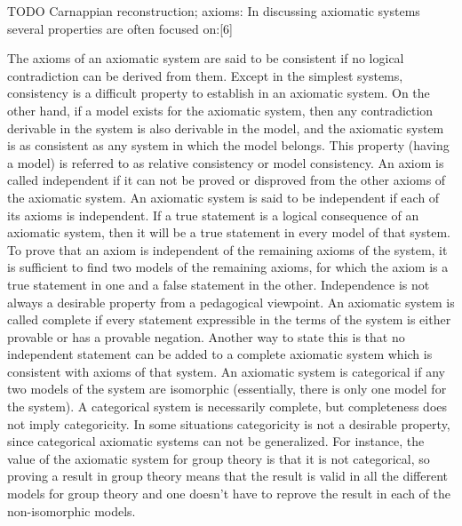 \documentclass{report}
\begin{document}
\begin{comment}
Finally two general points about why we do what we do in this text. Firstly it is a general goal of mathematics to generalize things and strip away anything that is not strictly necessary. Take for example the notion of a space. We know how to work with normal 3D space. We can measure distances and angles, we can look at neighbourhoods of points etc. Now the mathematician will ask 
- set of point with stuff layered on in order to approximate reality
- mathematical modus operandi (generalisation) -> new physics (cfr. Dirac etc.)
\end{comment}

TODO Carnappian reconstruction; axioms:
In discussing axiomatic systems several properties are often focused on:[6]

    The axioms of an axiomatic system are said to be consistent if no logical contradiction can be derived from them. Except in the simplest systems, consistency is a difficult property to establish in an axiomatic system. On the other hand, if a model exists for the axiomatic system, then any contradiction derivable in the system is also derivable in the model, and the axiomatic system is as consistent as any system in which the model belongs. This property (having a model) is referred to as relative consistency or model consistency.
    An axiom is called independent if it can not be proved or disproved from the other axioms of the axiomatic system. An axiomatic system is said to be independent if each of its axioms is independent. If a true statement is a logical consequence of an axiomatic system, then it will be a true statement in every model of that system. To prove that an axiom is independent of the remaining axioms of the system, it is sufficient to find two models of the remaining axioms, for which the axiom is a true statement in one and a false statement in the other. Independence is not always a desirable property from a pedagogical viewpoint.
    An axiomatic system is called complete if every statement expressible in the terms of the system is either provable or has a provable negation. Another way to state this is that no independent statement can be added to a complete axiomatic system which is consistent with axioms of that system.
    An axiomatic system is categorical if any two models of the system are isomorphic (essentially, there is only one model for the system). A categorical system is necessarily complete, but completeness does not imply categoricity. In some situations categoricity is not a desirable property, since categorical axiomatic systems can not be generalized. For instance, the value of the axiomatic system for group theory is that it is not categorical, so proving a result in group theory means that the result is valid in all the different models for group theory and one doesn't have to reprove the result in each of the non-isomorphic models.
\end{document}

